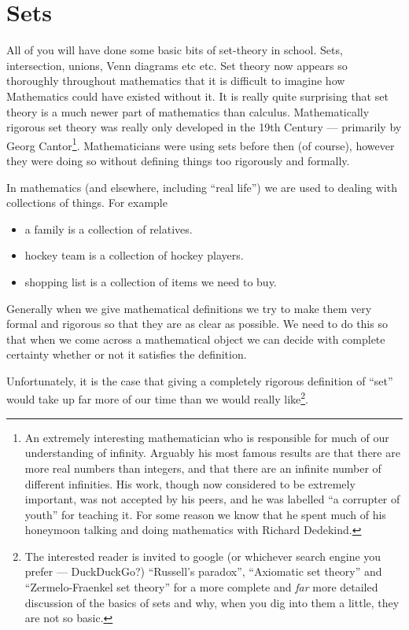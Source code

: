 \section{Sets}\label{sec sets}
All of you will have done some basic bits of set-theory in school. Sets,
intersection, unions, Venn diagrams etc etc. Set theory now appears so
thoroughly throughout mathematics that it is difficult to imagine how
Mathematics could have existed without it. It is really quite surprising that
set theory is a much newer part of mathematics than calculus. Mathematically rigorous set
theory was really only developed in the 19th Century --- primarily by Georg
Cantor\footnote{An extremely interesting mathematician who is responsible for
much of our understanding of infinity. Arguably his most famous results are
that there are more real numbers than integers, and that there are an infinite
number of different infinities. His work, though now considered to be extremely
important, was not accepted by his peers, and he was labelled ``a corrupter of
youth'' for teaching it. For some reason we know that he spent much of his
honeymoon talking and doing mathematics with Richard Dedekind.}. Mathematicians
were using sets before then (of course), however they were doing so without
defining things too rigorously and formally.

In mathematics (and elsewhere, including ``real life'') we are used to dealing
with collections of things. For example
\begin{itemize}
\item a family is a collection of relatives.
\item hockey team is a collection of hockey players.
\item shopping list is a collection of items we need to buy.
\end{itemize}

Generally when we give mathematical definitions we try to make them very
formal and rigorous so that they are as clear as possible. We need to do this
so that when we come across a mathematical object we can decide with complete
certainty whether or not it satisfies the definition.

Unfortunately, it is the case that giving a completely rigorous definition of
``set'' would take up far more of our time than we would really
like\footnote{The interested reader is invited to google (or whichever
search engine you prefer --- DuckDuckGo?) ``Russell's paradox'', ``Axiomatic set theory''
and ``Zermelo-Fraenkel set theory'' for a more complete and \emph{far} more
detailed discussion of the basics of sets and why, when you dig into them a
little, they are not so basic.}.

